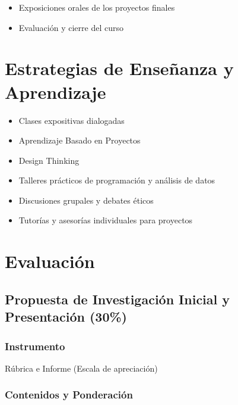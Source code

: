 \documentclass[11pt,letter,]{article}
\providecommand{\tightlist}{%
  \setlength{\itemsep}{0pt}\setlength{\parskip}{0pt}}
\begin{document}
\begin{itemize}
\tightlist
\item
  Exposiciones orales de los proyectos finales
\item
  Evaluación y cierre del curso
\end{itemize}

\hypertarget{estrategias-de-enseuxf1anza-y-aprendizaje}{%
\section{Estrategias de Enseñanza y
Aprendizaje}\label{estrategias-de-enseuxf1anza-y-aprendizaje}}

\begin{itemize}
\tightlist
\item
  Clases expositivas dialogadas
\item
  Aprendizaje Basado en Proyectos
\item
  Design Thinking
\item
  Talleres prácticos de programación y análisis de datos
\item
  Discusiones grupales y debates éticos
\item
  Tutorías y asesorías individuales para proyectos
\end{itemize}

\hypertarget{evaluaciuxf3n}{%
\section{Evaluación}\label{evaluaciuxf3n}}

\hypertarget{propuesta-de-investigaciuxf3n-inicial-y-presentaciuxf3n-30}{%
\subsection{Propuesta de Investigación Inicial y Presentación
(30\%)}\label{propuesta-de-investigaciuxf3n-inicial-y-presentaciuxf3n-30}}

\hypertarget{instrumento}{%
\subsubsection{Instrumento}\label{instrumento}}

Rúbrica e Informe (Escala de apreciación)

\hypertarget{contenidos-y-ponderaciuxf3n}{%
\subsubsection{Contenidos y
Ponderación}\label{contenidos-y-ponderaciuxf3n}}
\end{document}
